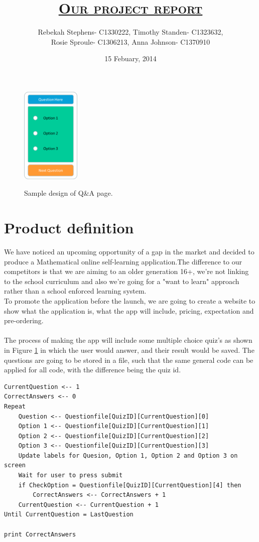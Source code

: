 \documentclass[10pt, a4paper]{article}
\title{\scshape{\underline{Our project report}}}
\author{Rebekah Stephens- C1330222, Timothy Standen- C1323632,\\ Rosie Sproule- C1306213, Anna Johnson- C1370910}
\date{15 Febuary, 2014}
\begin{document}
\maketitle
\begin{figure}
	\includegraphics[width = 28mm]{images/Picture8.png}
	\label{muiltquestion}
	\caption{Sample design of Q\&A page.}
\end{figure}
\section{Product definition}


We have noticed an upcoming opportunity of a gap in the market and decided to produce a Mathematical online self-learning application.The difference to our competitors is that we are aiming to an older generation 16+, we're not linking to the school curriculum and also we're going for a "want to learn" approach rather than a school enforced learning system. \\
To promote the application before the launch, we are going to create a website to show what the application is, what the app will include, pricing, expectation and pre-ordering. \\\\
The process of making the app will include some multiple choice quiz's as shown in Figure \ref{muiltquestion} in which the user would answer, and their result would be saved. The questions are going to be stored in a file, such that the same general code can be applied for all code, with the difference being the quiz id.
\begin{verbatim}
CurrentQuestion <-- 1
CorrectAnswers <-- 0
Repeat
    Question <-- Questionfile[QuizID][CurrentQuestion][0]
    Option 1 <-- Questionfile[QuizID][CurrentQuestion][1]
    Option 2 <-- Questionfile[QuizID][CurrentQuestion][2]
    Option 3 <-- Questionfile[QuizID][CurrentQuestion][3]
    Update labels for Quesion, Option 1, Option 2 and Option 3 on screen
    Wait for user to press submit
    if CheckOption = Questionfile[QuizID][CurrentQuestion][4] then
        CorrectAnswers <-- CorrectAnswers + 1
    CurrentQuestion <-- CurrentQuestion + 1
Until CurrentQuestion = LastQuestion

print CorrectAnswers
\end{verbatim}
\end{document}

